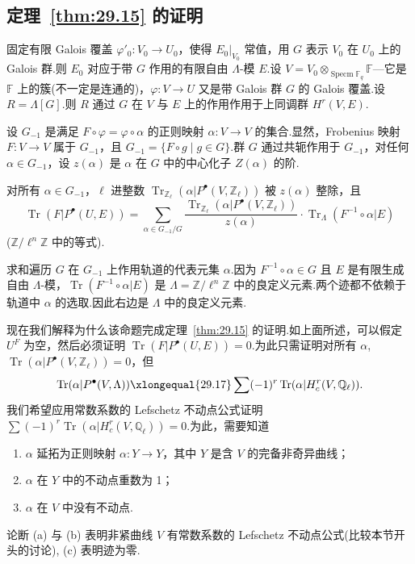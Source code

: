 \subsection*{定理~\ref{thm:29.15} 的证明}

固定有限 Galois 覆盖 $\varphi'_0 \colon V_0 \to U_0$，使得 $E_0|_{V_0}$ 常值，用 $G$ 表示 $V_0$ 在 $U_0$ 上的 Galois 群.则 $E_0$ 对应于带 $G$ 作用的有限自由 $\Lambda$-模 $E$.设 $V = V_0 \otimes_{\operatorname{Specm} \mathbb{F}_q} \mathbb{F}$---它是 $\mathbb{F}$ 上的簇(不一定是连通的)，$\varphi \colon V \to U$ 又是带 Galois 群 $G$ 的 Galois 覆盖.设 $R = \Lambda[G]$.则 $R$ 通过 $G$ 在 $V$ 与 $E$ 上的作用作用于上同调群 $H^{r}(V, E)$.

设 $G_{-1}$ 是满足 $F \circ \varphi = \varphi \circ \alpha$ 的正则映射 $\alpha \colon V \to V$ 的集合.显然，Frobenius 映射 $F \colon V \to V$ 属于 $G_{-1}$，且 $G_{-1} = \{F \circ g \mid g \in G\}$.群 $G$ 通过共轭作用于 $G_{-1}$，对任何 $\alpha \in G_{-1}$，设 $z(\alpha)$ 是 $\alpha$ 在 $G$ 中的中心化子 $Z(\alpha)$ 的阶.

\begin{proposition}\label{prop:29.19}
对所有 $\alpha \in G_{-1}$，$\ell$ 进整数 $\operatorname{Tr}_{\mathbb{Z}_{\ell}}(\alpha|P^{\bullet}(V, \mathbb{Z}_{\ell}))$ 被 $z(\alpha)$ 整除，且
\[
\operatorname{Tr}(F|P^{\bullet}(U, E)) = \sum_{\alpha \in G_{-1}/G} \frac{\operatorname{Tr}_{\mathbb{Z}_{\ell}}(\alpha|P^{\bullet}(V, \mathbb{Z}_{\ell}))}{z(\alpha)} \cdot \operatorname{Tr}_{\Lambda}(F^{-1} \circ \alpha|E)
\]
($\mathbb{Z}/\ell^{n}\mathbb{Z}$ 中的等式).

求和遍历 $G$ 在 $G_{-1}$ 上作用轨道的代表元集 $\alpha$.因为 $F^{-1} \circ \alpha \in G$ 且 $E$ 是有限生成自由 $\Lambda$-模，$\operatorname{Tr}(F^{-1} \circ \alpha|E)$ 是 $\Lambda = \mathbb{Z}/\ell^{n}\mathbb{Z}$ 中的良定义元素.两个迹都不依赖于轨道中 $\alpha$ 的选取.因此右边是 $\Lambda$ 中的良定义元素.
\end{proposition}

现在我们解释为什么该命题完成定理~\ref{thm:29.15} 的证明.如上面所述，可以假定 $U^{F}$ 为空，然后必须证明 $\operatorname{Tr}(F|P^{\bullet}(U, E)) = 0$.为此只需证明对所有 $\alpha$, $\operatorname{Tr}(\alpha|P^{\bullet}(V, \mathbb{Z}_{\ell})) = 0$，但
\[
\operatorname{Tr}(\alpha|P^{\bullet}(V, \Lambda)) \xlongequal{29.17} \sum (-1)^{r} \operatorname{Tr}(\alpha|H^{r}_{c}(V, \mathbb{Q}_{\ell})).
\]
我们希望应用常数系数的 Lefschetz 不动点公式证明 $\sum (-1)^{r} \operatorname{Tr}(\alpha|H^{r}_{c}(V, \mathbb{Q}_{\ell})) = 0$.为此，需要知道
\begin{enumerate}
  \item $\alpha$ 延拓为正则映射 $\alpha \colon Y \to Y$，其中 $Y$ 是含 $V$ 的完备非奇异曲线；
  \item $\alpha$ 在 $Y$ 中的不动点重数为 1；
  \item $\alpha$ 在 $V$ 中没有不动点.
\end{enumerate}
论断 (a) 与 (b) 表明非紧曲线 $V$ 有常数系数的 Lefschetz 不动点公式(比较本节开头的讨论), (c) 表明迹为零.

